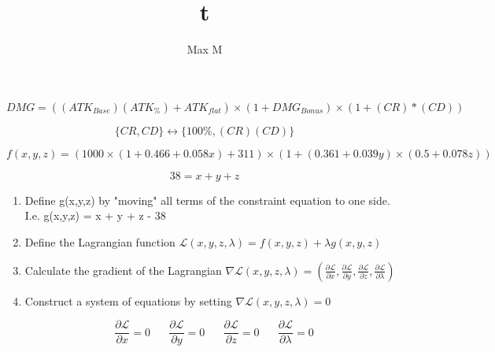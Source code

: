 \documentclass[a4paper]{article}
\title{t}
\author{Max M}
\begin{document}
\begin{equation}
	DMG = \left((ATK_{Base})(ATK_{\%}) + ATK_{flat}\right)\times (1 + DMG_{Bonus}) \times (1 + (CR)*(CD)) 
\end{equation}

\begin{equation}
	\{CR, CD\} \longleftrightarrow \{100\%, (CR)(CD)\}
\end{equation}


\begin{equation}
	f(x,y,z) = (1000\times(1 + 0.466 + 0.058x) + 311)\times(1 + (0.361 + 0.039y)\times(0.5 + 0.078z))
\end{equation}

\begin{equation}
	38 = x + y + z
\end{equation}

\begin{enumerate}
	\item Define g(x,y,z) by "moving" all terms of the constraint equation to one side. I.e. g(x,y,z) = x + y + z - 38
	\item Define the Lagrangian function $\mathcal{L}(x,y,z,\lambda) = f(x,y,z) + \lambda g(x,y,z)$
	\item Calculate the gradient of the Lagrangian $\nabla\mathcal{L}(x,y,z,\lambda) = \left( \frac{\partial\mathcal{L}}{\partial x}, \frac{\partial\mathcal{L}}{\partial y}, \frac{\partial\mathcal{L}}{\partial z}, \frac{\partial\mathcal{L}}{\partial \lambda}\right)$
	\item Construct a system of equations by setting $\nabla\mathcal{L}(x,y,z,\lambda) = 0$
	
	\begin{equation}
		\frac{\partial\mathcal{L}}{\partial x} = 0 \;\;\;\;\;\;
		\frac{\partial\mathcal{L}}{\partial y} = 0 \;\;\;\;\;\;
		\frac{\partial\mathcal{L}}{\partial z} = 0 \;\;\;\;\;\;
		\frac{\partial\mathcal{L}}{\partial \lambda} = 0
	\end{equation}
\end{enumerate}
\end{document}
